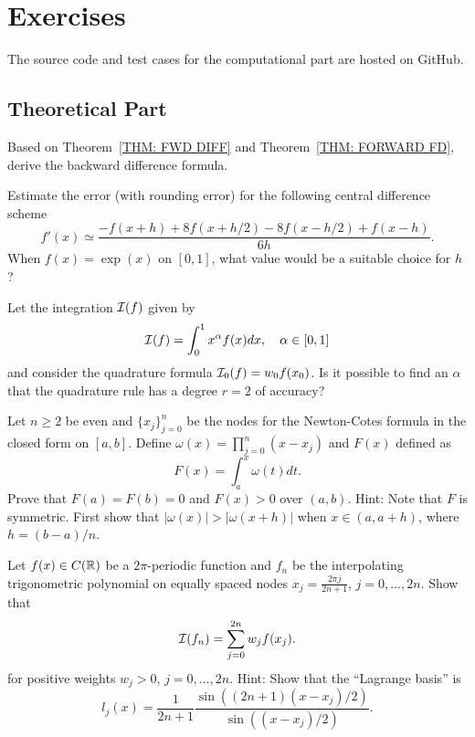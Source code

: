 \begin{example}
    
\end{example}
\section{Exercises}
The source code and test cases for the computational part are hosted on GitHub.

\subsection{Theoretical Part}
\begin{problem}
\label{Prb: 3-Bac-Dif}
    Based on Theorem~\ref{THM: FWD DIFF} and Theorem~\ref{THM: FORWARD FD}, derive the backward difference formula.
\end{problem}
\begin{problem}
    Estimate the error (with rounding error) for the following central difference scheme
    $$f'(x)\simeq \frac{-f(x + h) + 8f(x + h/2) - 8 f(x - h/2) + f(x - h)}{6h}.$$
    When $f(x)=\exp(x)$ on $[0, 1]$, what value would be a suitable choice for $h$?
\end{problem}
\begin{problem}
    Let the integration $\mathcal I(f)$ given by
    $$\mathcal I(f) = \int_0^1 x^{\alpha} f(x) dx,\quad \alpha\in [0, 1]$$
    and consider the quadrature formula $\mathcal I_0(f) = w_0 f(x_0)$. Is it possible to find an $\alpha$ that the quadrature rule has a degree $r= 2$ of accuracy?
\end{problem}
\begin{problem}
\label{Prb: 3-Exe-4}
    Let $n\ge 2$ be even and $\{ x_j\}_{j=0}^n$ be the nodes for the Newton-Cotes formula in the closed form on $[a, b]$. Define $\omega(x)=\prod_{j=0}^n (x - x_j)$ and $F(x)$ defined as 
    $$F(x) = \int_a^x \omega(t)dt.$$
    Prove that $F(a) = F(b) = 0$ and $F(x) > 0$ over $(a ,b)$. 
    Hint: Note that $F$ is symmetric. First show that $|\omega(x)| > |\omega(x + h)|$ when $x\in (a, a + h)$, where $h = (b-a)/n$.
\end{problem}
\begin{problem}
    Let $f(x)\in C(\mathbb R)$ be a $2\pi$-periodic function and $f_n$ be the interpolating trigonometric polynomial on equally spaced nodes $x_j = \frac{2\pi j}{2n+1}$, $j=0,\dots, 2n$. Show that 
    \begin{equation}
       \mathcal I(f_n) = \sum_{j=0}^{2n} w_j f(x_j).
    \end{equation}
    for positive weights $w_j > 0$, $j = 0,\dots, 2n$.
    Hint: Show that the ``Lagrange basis'' is $$l_j(x) =\frac{1}{2n+1} \frac{\sin((2n+1)(x- x_j)/2)}{\sin((x-x_j)/2)}.$$
\end{problem}

